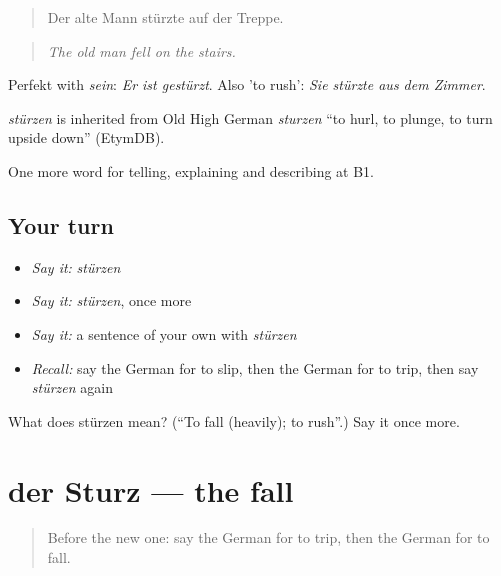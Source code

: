\begin{quote}
Der alte Mann stürzte auf der Treppe.
\end{quote}

\begin{quote}
\emph{The old man fell on the stairs.}
\end{quote}

Perfekt with \emph{sein}: \emph{Er ist gestürzt}. Also 'to rush': \emph{Sie stürzte aus dem Zimmer}.

\begin{cousinweb}
\emph{stürzen} is inherited from Old High German \emph{sturzen} \textquotedblleft{}to hurl, to plunge, to turn upside down\textquotedblright{} (EtymDB).
\end{cousinweb}

\begin{grammarlens}[title={What you've built}]
One more word for telling, explaining and describing at B1.
\end{grammarlens}

\subsection*{Your turn}
\begin{itemize}
\raggedright
  \item \emph{Say it:} \emph{stürzen}
  \item \emph{Say it:} \emph{stürzen}, once more
  \item \emph{Say it:} a sentence of your own with \emph{stürzen}
  \item \emph{Recall:} say the German for to slip, then the German for to trip, then say \emph{stürzen} again
\end{itemize}

\begin{tcolorbox}[breakable,colback=teal!4,colframe=teal!35!black,title={Before you move on}]
What does stürzen mean? (\textquotedblleft{}To fall (heavily); to rush\textquotedblright{}.) Say it once more.
\end{tcolorbox}
\section[der Sturz]{der Sturz — the fall}

\label{lesson:GE-C289-sturz}



\begin{quote}
Before the new one: say the German for to trip, then the German for to fall.
\end{quote}


